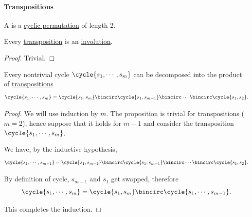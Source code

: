 \paragraph{Transpositions}

\begin{definition}\label{def:transposition}
  A  is a \hyperref[def:cyclic_permutation]{cyclic permutation} of length \( 2 \).
\end{definition}

\begin{proposition}\label{thm:transpositions_are_involutions}
  Every \hyperref[def:transposition]{transposition} is an \hyperref[def:categorical_involution]{involution}.
\end{proposition}
\begin{proof}
  Trivial.
\end{proof}

\begin{proposition}\label{thm:cycle_transposition_decomposition}
  Every nontrivial cycle \( \cycle{ s_1, \cdots, s_m } \) can be decomposed into the product of \hyperref[def:transposition]{transpositions}
  \begin{equation*}
    \cycle{ s_1, \cdots, s_m } = \cycle{ s_1, s_m } \bincirc \cycle{ s_1, s_{m-1} } \bincirc \cdots \bincirc \cycle{ s_1, s_2 }.
  \end{equation*}
\end{proposition}
\begin{proof}
  We will use induction by \( m \). The proposition is trivial for transpositions (\( m = 2 \)), hence suppose that it holds for \( m - 1 \) and consider the transposition \( \cycle{ s_1, \cdots, s_m } \).

  We have, by the inductive hypothesis,
  \begin{equation*}
    \cycle{ s_1, \cdots, s_{m - 1} }
    =
    \cycle{ s_1, s_{m - 1} } \bincirc \cycle{ s_1, s_{m-1} } \bincirc \cdots \bincirc \cycle{ s_1, s_2 }.
  \end{equation*}

  By definition of cycle, \( s_{m-1} \) and \( s_1 \) get swapped, therefore
  \begin{equation*}
    \cycle{ s_1, \cdots, s_m } = \cycle{ s_1, s_m } \bincirc \cycle{ s_1, \cdots, s_{m - 1} }.
  \end{equation*}

  This completes the induction.
\end{proof}

